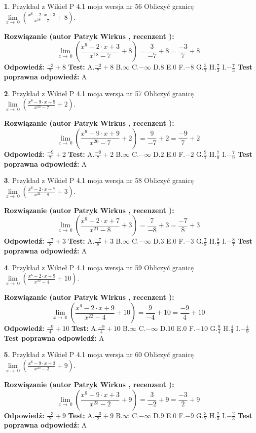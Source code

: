 \documentclass[12pt, a4paper]{article}
\theoremstyle{definition} %
\newtheorem{zad}{}
\newcommand{\zadStart}[1]{\begin{zad}#1\newline}
\newcommand{\zadStop}{\end{zad}}
\newcommand{\rozwStart}[2]{\noindent \textbf{Rozwiązanie (autor #1 , recenzent #2): }\newline}
\newcommand{\rozwStop}{\newline}
\newcommand{\odpStart}{\noindent \textbf{Odpowiedź:}\newline}
\newcommand{\odpStop}{\newline}
\newcommand{\testStart}{\noindent \textbf{Test:}\newline}
\newcommand{\testStop}{\newline}
\newcommand{\kluczStart}{\noindent \textbf{Test poprawna odpowiedź:}\newline}
\newcommand{\kluczStop}{\newline}
\begin{document}
\zadStart{Przykład z Wikieł P 4.1 moja wersja nr 56}
Obliczyć granicę $\lim\limits_{x\to\ 0}(\frac{x^{6}-2 \cdot x +3}{x^{18}-7}+8)$.
\zadStop
\rozwStart{Patryk Wirkus}{}
$$\lim\limits_{x\to\ 0}(\frac{x^{6}-2 \cdot x +3}{x^{18}-7}+8)=\frac{3}{-7}+8=\frac{-3}{7}+8$$
\rozwStop
\odpStart
$\frac{-3}{7}+8$
\odpStop
\testStart
A.$\frac{-3}{7}+8$
B.$\infty$
C.$-\infty$
D.$8$
E.$0$
F.$-8$
G.$\frac{3}{7}$
H.$\frac{7}{3}$
I.$-\frac{7}{3}$
\testStop
\kluczStart
A
\kluczStop



\zadStart{Przykład z Wikieł P 4.1 moja wersja nr 57}
Obliczyć granicę $\lim\limits_{x\to\ 0}(\frac{x^{6}-9 \cdot x +9}{x^{20}-7}+2)$.
\zadStop
\rozwStart{Patryk Wirkus}{}
$$\lim\limits_{x\to\ 0}(\frac{x^{6}-9 \cdot x +9}{x^{20}-7}+2)=\frac{9}{-7}+2=\frac{-9}{7}+2$$
\rozwStop
\odpStart
$\frac{-9}{7}+2$
\odpStop
\testStart
A.$\frac{-9}{7}+2$
B.$\infty$
C.$-\infty$
D.$2$
E.$0$
F.$-2$
G.$\frac{9}{7}$
H.$\frac{7}{9}$
I.$-\frac{7}{9}$
\testStop
\kluczStart
A
\kluczStop



\zadStart{Przykład z Wikieł P 4.1 moja wersja nr 58}
Obliczyć granicę $\lim\limits_{x\to\ 0}(\frac{x^{6}-2 \cdot x +7}{x^{21}-8}+3)$.
\zadStop
\rozwStart{Patryk Wirkus}{}
$$\lim\limits_{x\to\ 0}(\frac{x^{6}-2 \cdot x +7}{x^{21}-8}+3)=\frac{7}{-8}+3=\frac{-7}{8}+3$$
\rozwStop
\odpStart
$\frac{-7}{8}+3$
\odpStop
\testStart
A.$\frac{-7}{8}+3$
B.$\infty$
C.$-\infty$
D.$3$
E.$0$
F.$-3$
G.$\frac{7}{8}$
H.$\frac{8}{7}$
I.$-\frac{8}{7}$
\testStop
\kluczStart
A
\kluczStop



\zadStart{Przykład z Wikieł P 4.1 moja wersja nr 59}
Obliczyć granicę $\lim\limits_{x\to\ 0}(\frac{x^{6}-2 \cdot x +9}{x^{22}-4}+10)$.
\zadStop
\rozwStart{Patryk Wirkus}{}
$$\lim\limits_{x\to\ 0}(\frac{x^{6}-2 \cdot x +9}{x^{22}-4}+10)=\frac{9}{-4}+10=\frac{-9}{4}+10$$
\rozwStop
\odpStart
$\frac{-9}{4}+10$
\odpStop
\testStart
A.$\frac{-9}{4}+10$
B.$\infty$
C.$-\infty$
D.$10$
E.$0$
F.$-10$
G.$\frac{9}{4}$
H.$\frac{4}{9}$
I.$-\frac{4}{9}$
\testStop
\kluczStart
A
\kluczStop



\zadStart{Przykład z Wikieł P 4.1 moja wersja nr 60}
Obliczyć granicę $\lim\limits_{x\to\ 0}(\frac{x^{6}-9 \cdot x +3}{x^{23}-2}+9)$.
\zadStop
\rozwStart{Patryk Wirkus}{}
$$\lim\limits_{x\to\ 0}(\frac{x^{6}-9 \cdot x +3}{x^{23}-2}+9)=\frac{3}{-2}+9=\frac{-3}{2}+9$$
\rozwStop
\odpStart
$\frac{-3}{2}+9$
\odpStop
\testStart
A.$\frac{-3}{2}+9$
B.$\infty$
C.$-\infty$
D.$9$
E.$0$
F.$-9$
G.$\frac{3}{2}$
H.$\frac{2}{3}$
I.$-\frac{2}{3}$
\testStop
\kluczStart
A
\kluczStop
\end{document}
